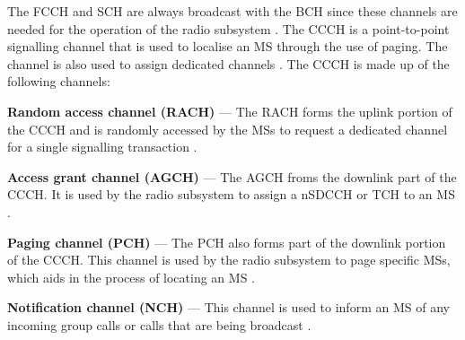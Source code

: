 The FCCH and SCH are always broadcast with the BCH since these channels are needed for the operation of the radio subsystem \cite{GSMArchitectureProtocolsServices}. The CCCH is a point-to-point signalling channel that is used to localise an MS through the use of paging. The channel is also used to assign dedicated channels \cite{GSMArchitectureProtocolsServices}. The CCCH is made up of the following channels:
\begin{description}
\item{\textbf{Random access channel (RACH)}} --- The RACH forms the uplink portion of the CCCH and is randomly accessed by the MSs to request a dedicated channel for a single signalling transaction \cite{GSMArchitectureProtocolsServices}.
\item{\textbf{Access grant channel (AGCH)}} --- The AGCH froms the downlink part of the CCCH. It is used by the radio subsystem to assign a nSDCCH or TCH to an MS \cite{GSMArchitectureProtocolsServices}.
\item{\textbf{Paging channel (PCH)}} --- The PCH also forms part of the downlink portion of the CCCH. This channel is used by the radio subsystem to page specific MSs, which aids in the process of locating an MS \cite{GSMArchitectureProtocolsServices}.
\item{\textbf{Notification channel (NCH)}} --- This channel is used to inform an MS of any incoming group calls or calls that are being broadcast \cite{GSMArchitectureProtocolsServices}.
\end{description}


